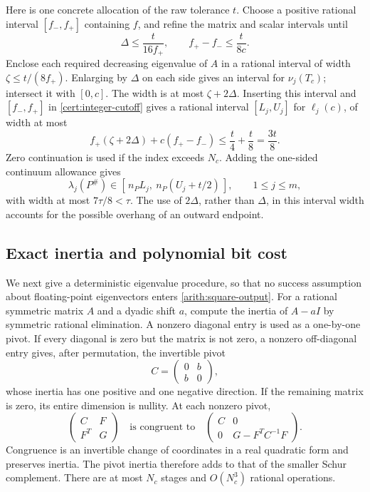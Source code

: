 \documentclass[11pt,reqno]{amsart}
\numberwithin{equation}{section}
\begin{document}
Here is one concrete allocation of the raw tolerance $t$.
Choose a positive rational interval $[f_-,f_+]$ containing $f$,
and refine the matrix and scalar intervals until
\begin{equation}\label{arith:square-budget}
 \Delta\le\frac{t}{16f_+},\qquad
 f_+-f_-\le\frac{t}{8c}.
\end{equation}
Enclose each required decreasing eigenvalue of $A$ in a rational
interval of width
$\zeta\le t/(8f_+)$.  Enlarging by $\Delta$ on each side gives
an interval for $\nu_j(T_c)$; intersect it with $[0,c]$.
The width is at most $\zeta+2\Delta$.
Inserting this interval and $[f_-,f_+]$ in
\eqref{cert:integer-cutoff} gives a rational interval
$[L_j,U_j]$ for $\ell_j(c)$, of width at most
\[
 f_+(\zeta+2\Delta)+c(f_+-f_-)
 \le\frac t4+\frac t8=\frac{3t}{8}.
\]
Zero continuation is used if the index exceeds $N_c$.
Adding the one-sided continuum allowance gives
\begin{equation}\label{arith:square-output}
 \lambda_j(P^\#)\in
 [\,n_PL_j,\ n_P(U_j+t/2)\,],\qquad 1\le j\le m,
\end{equation}
with width at most $7\tau/8<\tau$.
The use of $2\Delta$, rather than $\Delta$, in this interval
width accounts for the possible overhang of an outward
endpoint.

\subsection{Exact inertia and polynomial bit cost}
\label{arith:inertia}

We next give a deterministic eigenvalue procedure, so that no
success assumption about floating-point eigenvectors enters
\eqref{arith:square-output}.  For a rational symmetric matrix
$A$ and a dyadic shift $a$, compute the inertia of $A-aI$ by
symmetric rational elimination.  A nonzero diagonal entry is
used as a one-by-one pivot.  If every diagonal is zero but the
matrix is not zero, a nonzero off-diagonal entry gives, after
permutation, the invertible pivot
\[
 C=\begin{pmatrix}0&b\\ b&0\end{pmatrix},
\]
whose inertia has one positive and one negative direction.
If the remaining matrix is zero, its entire dimension is
nullity.  At each nonzero pivot,
\[
 \begin{pmatrix}C&F\\ F^T&G\end{pmatrix}
 \quad\text{is congruent to}\quad
 \begin{pmatrix}C&0\\0&G-F^TC^{-1}F\end{pmatrix}.
\]
Congruence is an invertible change of coordinates in a real
quadratic form and preserves inertia.  The pivot inertia
therefore adds to that of the smaller Schur complement.
There are at most $N_c$ stages and $O(N_c^3)$ rational
operations.
\end{document}
